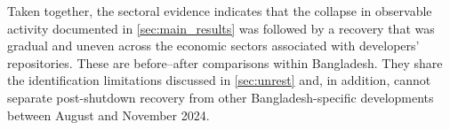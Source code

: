 Taken together, the sectoral evidence indicates that the collapse in observable activity documented in \cref{sec:main_results} was followed by a recovery that was gradual and uneven across the economic sectors associated with developers' repositories. These are before--after comparisons within Bangladesh. They share the identification limitations discussed in \cref{sec:unrest} and, in addition, cannot separate post-shutdown recovery from other Bangladesh-specific developments between August and November 2024.
